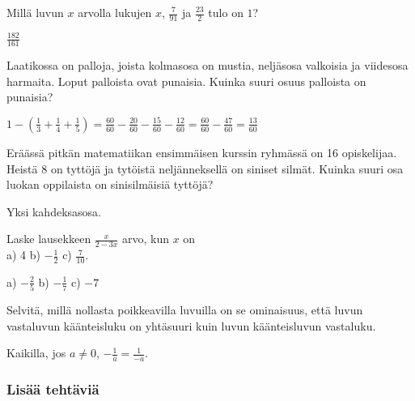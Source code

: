 \begin{tehtavasivu}
\begin{tehtava}
Millä luvun $x$ arvolla lukujen $x$, $\frac{7}{91}$ ja $\frac{23}{2}$ tulo on $1$?
\begin{vastaus}
$\frac{182}{161}$
\end{vastaus}
\end{tehtava}

\begin{tehtava} 
        Laatikossa on palloja, joista kolmasosa on mustia, neljäsosa
        valkoisia ja viidesosa harmaita. Loput palloista ovat 		 	punaisia.
        Kuinka suuri osuus palloista on punaisia?
        
        \begin{vastaus}
            $1-(\frac{1}{3}+\frac{1}{4}+\frac{1}{5})
            = \frac{60}{60}-\frac{20}{60}-\frac{15}{60}-\frac{12}{60}
            = \frac{60}{60}-\frac{47}{60}
            = \frac{13}{60}$
        \end{vastaus}
    \end{tehtava}
    
\begin{tehtava} 
Eräässä pitkän matematiikan ensimmäisen kurssin ryhmässä on 16 opiskelijaa. Heistä 8 on tyttöjä ja tytöistä neljänneksellä on siniset silmät. Kuinka suuri osa luokan oppilaista on sinisilmäisiä tyttöjä?
        \begin{vastaus}
			Yksi kahdeksasosa.
        \end{vastaus}
\end{tehtava}

\begin{tehtava}
Laske lausekkeen $\frac{x}{2-3x}$ arvo, kun $x$ on \\ a) 4 \qquad b) $-\frac{1}{2}$ \qquad c) $\frac{7}{10}$.
\begin{vastaus}
a) $-\frac{2}{5}$ \qquad b) $-\frac{1}{7}$ \qquad c) $-7$
\end{vastaus}
\end{tehtava}

\begin{tehtava}
Selvitä, millä nollasta poikkeavilla luvuilla on se ominaisuus, että luvun vastaluvun käänteisluku on yhtäsuuri kuin luvun käänteisluvun vastaluku.
\begin{vastaus}
Kaikilla, jos $a \neq 0$, $-\frac{1}{a} = \frac{1}{-a}$.
\end{vastaus}
\end{tehtava}

\subsubsection*{Lisää tehtäviä}


\end{tehtavasivu}
